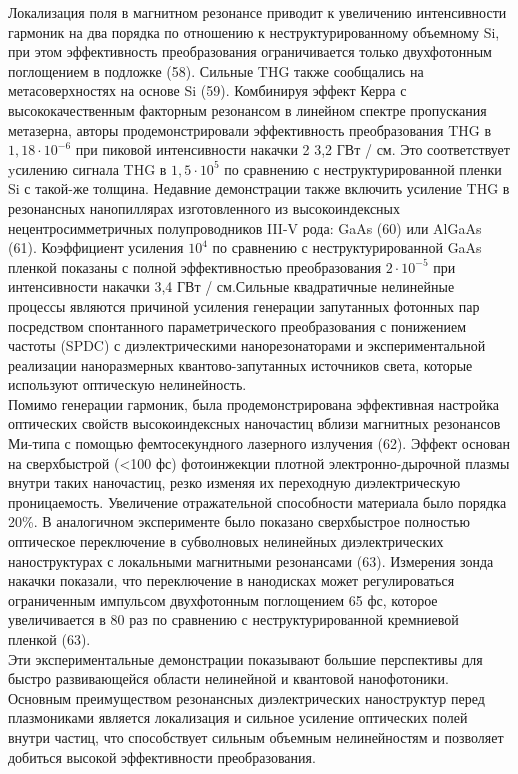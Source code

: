 Локализация поля в магнитном резонансе приводит к увеличению интенсивности гармоник на два порядка по отношению к неструктурированному объемному Si, при этом эффективность преобразования ограничивается только двухфотонным поглощением в подложке (58). Сильные THG также сообщались на метасоверхностях на основе Si (59). Комбинируя эффект Керра с высококачественным факторным резонансом в линейном спектре пропускания метазерна, авторы продемонстрировали эффективность преобразования THG в $1,18\cdot 10^{-6}$ при пиковой интенсивности накачки 2 3,2 ГВт / см. Это соответствует yсилению сигнала THG в $1,5\cdot10^5$  по сравнению с  неструктурированной пленки Si с такой-же толщина. Недавние демонстрации также включить усиление THG в резонансных нанопиллярах изготовленного из высокоиндексных нецентросимметричных полупроводников III-V рода: GaAs (60) или AlGaAs (61). Коэффициент усиления $10^4$ по сравнению с неструктурированной GaAs пленкой показаны с полной эффективностью преобразования $2\cdot10^{-5}$  при интенсивности накачки 3,4 ГВт / см.Сильные квадратичные нелинейные процессы являются причиной усиления генерации запутанных фотонных пар посредством спонтанного параметрического преобразования с понижением частоты (SPDC) с диэлектрическими нанорезонаторами и экспериментальной реализации наноразмерных квантово-запутанных источников света, которые используют оптическую нелинейность.
\\
\hspace*{2mm}
Помимо генерации гармоник, была продемонстрирована эффективная настройка оптических свойств высокоиндексных наночастиц вблизи магнитных резонансов Ми-типа с помощью фемтосекундного лазерного излучения (62). Эффект основан на сверхбыстрой (<100 фс) фотоинжекции плотной электронно-дырочной плазмы внутри таких наночастиц, резко изменяя их переходную диэлектрическую проницаемость. Увеличение отражательной способности материала было порядка 20\%. В аналогичном эксперименте было показано сверхбыстрое полностью оптическое переключение в субволновых нелинейных диэлектрических наноструктурах с локальными магнитными резонансами (63). Измерения зонда накачки показали, что переключение в нанодисках может регулироваться ограниченным импульсом двухфотонным поглощением 65 фс, которое увеличивается в 80 раз по сравнению с неструктурированной кремниевой пленкой (63).
\\
\hspace*{2mm}
Эти экспериментальные демонстрации показывают большие перспективы для быстро развивающейся области нелинейной и квантовой нанофотоники. Основным преимуществом резонансных диэлектрических наноструктур перед плазмониками является локализация и сильное усиление оптических полей внутри частиц, что способствует сильным объемным нелинейностям и позволяет добиться высокой эффективности преобразования.

